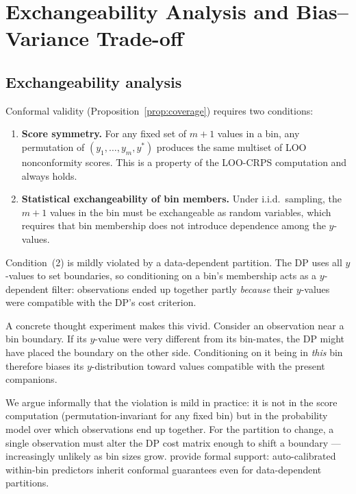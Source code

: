 \documentclass[11pt]{article}
\begin{document}
\section{Exchangeability Analysis and Bias--Variance Trade-off}
\label{app:exch}

\subsection*{Exchangeability analysis}

Conformal validity (Proposition~\ref{prop:coverage}) requires two conditions:
\begin{enumerate}
  \item \textbf{Score symmetry.}
    For any fixed set of $m+1$ values in a bin, any permutation of
    $(y_1,\ldots,y_m,y^*)$ produces the same multiset of LOO nonconformity scores.
    This is a property of the LOO-CRPS computation and always holds.
  \item \textbf{Statistical exchangeability of bin members.}
    Under i.i.d.\ sampling, the $m+1$ values in the bin must be exchangeable
    as random variables, which requires that bin membership does not introduce
    dependence among the $y$-values.
\end{enumerate}

Condition~(2) is mildly violated by a data-dependent partition.
The DP uses all $y$-values to set boundaries, so conditioning on a bin's membership
acts as a $y$-dependent filter: observations ended up together partly
\emph{because} their $y$-values were compatible with the DP's cost criterion.

A concrete thought experiment makes this vivid.
Consider an observation near a bin boundary.
If its $y$-value were very different from its bin-mates, the DP might have placed
the boundary on the other side.
Conditioning on it being in \emph{this} bin therefore biases its $y$-distribution
toward values compatible with the present companions.

We argue informally that the violation is mild in practice: it is not in the score computation
(permutation-invariant for any fixed bin) but in the probability model over which
observations end up together.
For the partition to change, a single observation must alter the DP cost matrix
enough to shift a boundary --- increasingly unlikely as bin sizes grow.
\citet{AllenEtAl2025} provide formal support: auto-calibrated
within-bin predictors inherit conformal guarantees even for data-dependent partitions.
\end{document}
